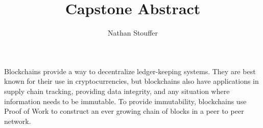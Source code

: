 \documentclass[11pt]{article}
\title{Capstone Abstract}
\author{Nathan Stouffer}
\date{}
\begin{document}
    \maketitle

    Blockchains provide a way to decentralize ledger-keeping systems.
    They are best known for their use in cryptocurrencies, but blockchains also have applications in supply chain tracking, providing data integrity, and any situation where information needs to be immutable.
    To provide immutability, blockchains use Proof of Work to construct an ever growing chain of blocks in a peer to peer network.




\end{document}
